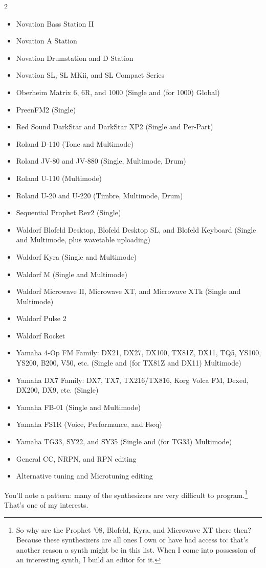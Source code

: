 \documentclass{article}
\begin{document}
{\begin{multicols}{2}
\begin{flushleft}
\begin{itemize}
\item Novation Bass Station II
\item Novation A Station
\item Novation Drumstation and D Station
\item Novation SL, SL MKii, and SL Compact Series
\item Oberheim Matrix 6, 6R, and 1000 (Single and (for 1000) Global)
\item PreenFM2 (Single)
\item Red Sound DarkStar and DarkStar XP2 (Single and Per-Part)
\item Roland D-110 (Tone and Multimode)
\item Roland JV-80 and JV-880 (Single, Multimode, Drum)
\item Roland U-110 (Multimode)
\item Roland U-20 and U-220 (Timbre, Multimode, Drum)
\item Sequential Prophet Rev2 (Single)
\item Waldorf Blofeld Desktop, Blofeld Desktop SL, and Blofeld Keyboard (Single and Multimode, plus wavetable uploading)
\item Waldorf Kyra (Single and Multimode)
\item Waldorf M (Single and Multimode)
\item Waldorf Microwave II, Microwave XT, and Microwave XTk (Single and Multimode)
\item Waldorf Pulse 2
\item Waldorf Rocket
\item Yamaha 4-Op FM Family: DX21, DX27, DX100, TX81Z, DX11, TQ5, YS100, YS200, B200, V50, etc. (Single and  (for TX81Z and DX11) Multimode)
\item Yamaha DX7 Family: DX7, TX7, TX216/TX816, Korg Volca FM, Dexed, DX200, DX9, etc. (Single)
\item Yamaha FB-01 (Single and Multimode)
\item Yamaha FS1R (Voice, Performance, and Fseq)
\item Yamaha TG33, SY22, and SY35 (Single and (for TG33) Multimode)
\item General CC, NRPN, and RPN editing
\item Alternative tuning and Microtuning editing
\end{itemize}
\end{flushleft}
\end{multicols}
}

You'll note a pattern: many of the synthesizers are very difficult to program.\footnote{So why are the Prophet '08, Blofeld, Kyra, and Microwave XT there then?  Because these synthesizers are all ones I own or have had access to: that's another reason a synth might be in this list.  When I come into possession of an interesting synth, I build an editor for it.}  That's one of my interests.  
\end{document}
